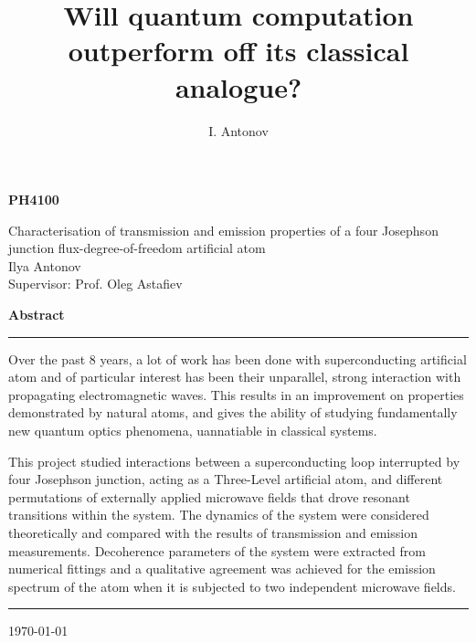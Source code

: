 

\newcommand{\mytitlepage}[3]{%
	\begin{titlepage}
		\centering\vspace*{0.6in}\bgroup
		\Huge\bfseries #1 \par
		\egroup\vspace{0.5in}\bgroup
		\Huge #2\\[0.1in]
		\egroup\vspace{0.2in}\bgroup
		\Large Ilya Antonov\\[0.08in]
		\egroup\vspace{0.2in}\bgroup
		\Large Supervisor: Prof. Oleg Astafiev
		\egroup
		\par\vspace{1.5in}
		{\LARGE\bfseries Abstract}
		\par\vspace{0.1in}\hrule\vspace{0.1in}
		\begin{minipage}{0.95\textwidth}
			#3
		\end{minipage}
		\vspace{0.1in}\hrule\vspace{0.2in}\vfill
		\today
	\end{titlepage}
}

\graphicspath{{images_major_project/diagrams_photos/}{images_major_project/data_simulations/}{images_major_project/setup/}}



	\title{Will quantum computation outperform off its classical analogue?}
	\author{I. Antonov}
	\mytitlepage{PH4100}{Characterisation of transmission and emission properties of a four Josephson junction flux-degree-of-freedom artificial atom}{Over the past 8 years, a lot of work has been done with superconducting artificial atom and of particular interest has been their unparallel, strong interaction with propagating electromagnetic waves. This results in an improvement on properties demonstrated by natural atoms, and gives the ability of studying fundamentally new quantum optics phenomena, uannatiable in classical systems.
		
	This project studied interactions between a superconducting loop interrupted by four Josephson junction, acting as a Three-Level artificial atom, and different permutations of externally applied microwave fields that drove resonant transitions within the system. The dynamics of the system were considered theoretically and compared with the results of transmission and emission measurements. Decoherence parameters of the system were extracted from numerical fittings and a qualitative agreement was achieved for the emission spectrum of the atom when it is subjected to two independent microwave fields.}

